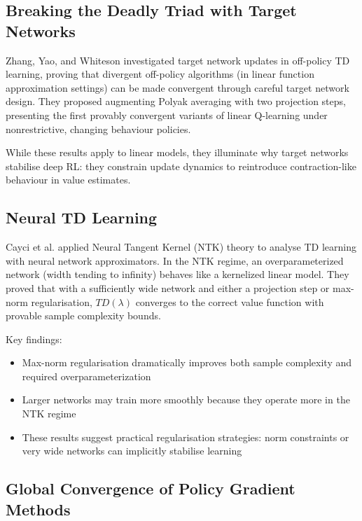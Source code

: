 \documentclass[12pt,a4paper]{report}
\begin{document}
\subsection{Breaking the Deadly Triad with Target Networks}

Zhang, Yao, and Whiteson \cite{zhang2021breaking} investigated target network updates in off-policy TD learning, proving that divergent off-policy algorithms (in linear function approximation settings) can be made convergent through careful target network design. They proposed augmenting Polyak averaging with two projection steps, presenting the first provably convergent variants of linear Q-learning under nonrestrictive, changing behaviour policies.

While these results apply to linear models, they illuminate why target networks stabilise deep RL: they constrain update dynamics to reintroduce contraction-like behaviour in value estimates.

\subsection{Neural TD Learning}

Cayci et al. \cite{cayci2021sample} applied Neural Tangent Kernel (NTK) theory to analyse TD learning with neural network approximators. In the NTK regime, an overparameterized network (width tending to infinity) behaves like a kernelized linear model. They proved that with a sufficiently wide network and either a projection step or max-norm regularisation, $TD(\lambda)$ converges to the correct value function with provable sample complexity bounds.

Key findings:
\begin{itemize}
    \item Max-norm regularisation dramatically improves both sample complexity and required overparameterization
    \item Larger networks may train more smoothly because they operate more in the NTK regime
    \item These results suggest practical regularisation strategies: norm constraints or very wide networks can implicitly stabilise learning
\end{itemize}

\subsection{Global Convergence of Policy Gradient Methods}
\end{document}
